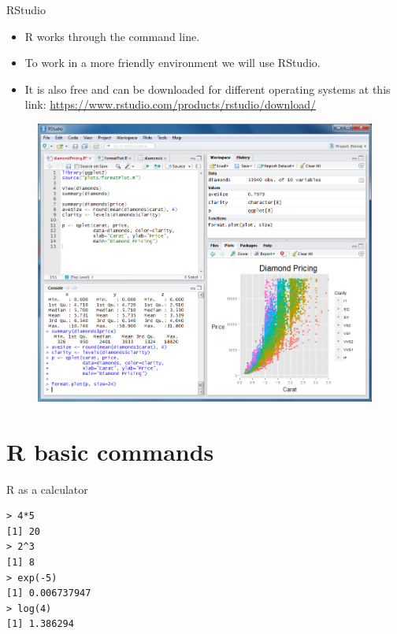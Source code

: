 \documentclass[handout]{beamer}
\begin{document}
\begin{frame}{RStudio}
\scriptsize{
\begin{itemize}
  \item R works through the command line.
 \item To work in a more friendly environment we will use RStudio.
 \item It is also free and can be downloaded for different operating systems at this link: \url{https://www.rstudio.com/products/rstudio/download/}
\end{itemize}

} 

\begin{figure}[h!]
	\centering
	\includegraphics[scale=0.2]{pics/rstudio.png}
\end{figure}

 
\end{frame}


\section{R basic commands}

\begin{frame}[fragile]{R as a calculator}
\begin{verbatim}
> 4*5
[1] 20
> 2^3
[1] 8
> exp(-5)
[1] 0.006737947
> log(4)
[1] 1.386294
\end{verbatim}

 
\end{frame}
\end{document}
